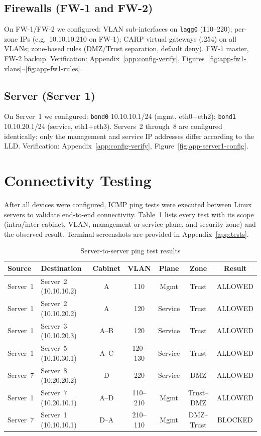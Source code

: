 \subsection{Firewalls (FW-1 and FW-2)}
On FW-1/FW-2 we configured: VLAN sub-interfaces on \texttt{lagg0} (110--220); per-zone IPs (e.g.\ 10.10.10.210 on FW-1); CARP virtual gateways (.254) on all VLANs; zone-based rules (DMZ/Trust separation, default deny). FW-1 master, FW-2 backup. Verification: Appendix~\ref{app:config-verify}, Figures~\ref{fig:app-fw1-vlans}--\ref{fig:app-fw1-rules}.

\subsection{Server (Server 1)}
On Server~1 we configured: \texttt{bond0} 10.10.10.1/24 (mgmt, eth0+eth2); \texttt{bond1} 10.10.20.1/24 (service, eth1+eth3). Servers~2 through~8 are configured identically; only the management and service IP addresses differ according to the LLD. Verification: Appendix~\ref{app:config-verify}, Figure~\ref{fig:app-server1-config}.

\section{Connectivity Testing}

After all devices were configured, ICMP ping tests were executed between Linux servers to validate end-to-end connectivity. Table~\ref{tab:ping-tests} lists every test with its scope (intra/inter cabinet, VLAN, management or service plane, and security zone) and the observed result. Terminal screenshots are provided in Appendix~\ref{app:tests}.

\begin{table}[htbp]
    \centering
    \small
    \caption{Server-to-server ping test results}
    \label{tab:ping-tests}
    \begin{tabular}{|l|l|c|c|c|c|c|}
        \hline
        \textbf{Source} & \textbf{Destination} & \textbf{Cabinet} & \textbf{VLAN} & \textbf{Plane} & \textbf{Zone} & \textbf{Result} \\
        \hline
        Server~1 & Server~2 (10.10.10.2) & A & 110 & Mgmt & Trust & ALLOWED \\
        \hline
        Server~1 & Server~2 (10.10.20.2) & A & 120 & Service & Trust & ALLOWED \\
        \hline
        Server~1 & Server~3 (10.10.20.3) & A--B & 120 & Service & Trust & ALLOWED \\
        \hline
        Server~1 & Server~5 (10.10.30.1) & A--C & 120--130 & Service & Trust & ALLOWED \\
        \hline
        Server~7 & Server~8 (10.20.20.2) & D & 220 & Service & DMZ & ALLOWED \\
        \hline
        Server~1 & Server~7 (10.20.10.1) & A--D & 110--210 & Mgmt & Trust--DMZ & ALLOWED \\
        \hline
        Server~7 & Server~1 (10.10.10.1) & D--A & 210--110 & Mgmt & DMZ--Trust & BLOCKED \\
        \hline
    \end{tabular}
\end{table}

